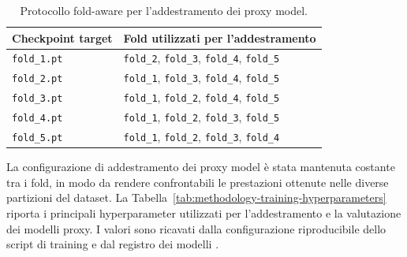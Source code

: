 \begin{table}[H]
\centering
\caption{Protocollo fold-aware per l'addestramento dei proxy model.}
\label{tab:methodology-fold-aware-training}
\begin{tabularx}{\textwidth}{@{}L{7.8cm}X@{}}
\toprule
\textbf{Checkpoint target} & \textbf{Fold utilizzati per l'addestramento} \\
\midrule
\texttt{fold\_1.pt} & \texttt{fold\_2}, \texttt{fold\_3}, \texttt{fold\_4}, \texttt{fold\_5} \\
\texttt{fold\_2.pt} & \texttt{fold\_1}, \texttt{fold\_3}, \texttt{fold\_4}, \texttt{fold\_5} \\
\texttt{fold\_3.pt} & \texttt{fold\_1}, \texttt{fold\_2}, \texttt{fold\_4}, \texttt{fold\_5} \\
\texttt{fold\_4.pt} & \texttt{fold\_1}, \texttt{fold\_2}, \texttt{fold\_3}, \texttt{fold\_5} \\
\texttt{fold\_5.pt} & \texttt{fold\_1}, \texttt{fold\_2}, \texttt{fold\_3}, \texttt{fold\_4} \\
\bottomrule
\end{tabularx}
\end{table}


La configurazione di addestramento dei proxy model è stata mantenuta costante
tra i fold, in modo da rendere confrontabili le prestazioni ottenute nelle
diverse partizioni del dataset. La Tabella~\ref{tab:methodology-training-hyperparameters}
riporta i principali hyperparameter utilizzati per l'addestramento e la
valutazione dei modelli proxy. I valori sono ricavati dalla configurazione
riproducibile dello script di training 
e dal registro dei modelli .

